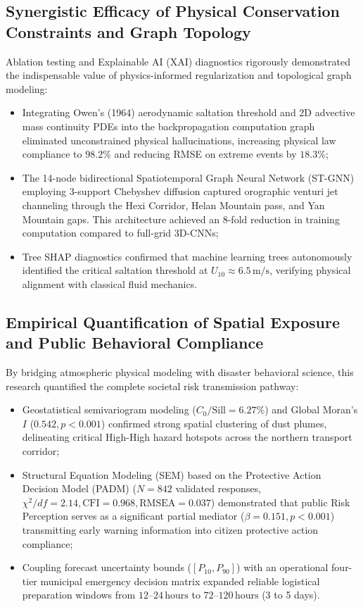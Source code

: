 \subsection{Synergistic Efficacy of Physical Conservation Constraints and Graph Topology}
\label{subsec:concl_pinn_gnn}

Ablation testing and Explainable AI (XAI) diagnostics rigorously demonstrated the indispensable value of physics-informed regularization and topological graph modeling:
\begin{itemize}
    \item Integrating Owen's (1964) aerodynamic saltation threshold and 2D advective mass continuity PDEs into the backpropagation computation graph eliminated unconstrained physical hallucinations, increasing physical law compliance to $98.2\%$ and reducing RMSE on extreme events by $18.3\%$;
    \item The 14-node bidirectional Spatiotemporal Graph Neural Network (ST-GNN) employing 3-support Chebyshev diffusion captured orographic venturi jet channeling through the Hexi Corridor, Helan Mountain pass, and Yan Mountain gaps. This architecture achieved an 8-fold reduction in training computation compared to full-grid 3D-CNNs;
    \item Tree SHAP diagnostics confirmed that machine learning trees autonomously identified the critical saltation threshold at $U_{10} \approx 6.5\,\text{m/s}$, verifying physical alignment with classical fluid mechanics.
\end{itemize}

\subsection{Empirical Quantification of Spatial Exposure and Public Behavioral Compliance}
\label{subsec:concl_spatial_socio}

By bridging atmospheric physical modeling with disaster behavioral science, this research quantified the complete societal risk transmission pathway:
\begin{itemize}
    \item Geostatistical semivariogram modeling ($C_0 / \text{Sill} = 6.27\%$) and Global Moran's $I$ ($0.542, p < 0.001$) confirmed strong spatial clustering of dust plumes, delineating critical High-High hazard hotspots across the northern transport corridor;
    \item Structural Equation Modeling (SEM) based on the Protective Action Decision Model (PADM) ($N=842$ validated responses, $\chi^2/df = 2.14, \text{CFI} = 0.968, \text{RMSEA} = 0.037$) demonstrated that public Risk Perception serves as a significant partial mediator ($\beta = 0.151, p < 0.001$) transmitting early warning information into citizen protective action compliance;
    \item Coupling forecast uncertainty bounds ($[P_{10}, P_{90}]$) with an operational four-tier municipal emergency decision matrix expanded reliable logistical preparation windows from $12\text{--}24\,\text{hours}$ to $72\text{--}120\,\text{hours}$ (3 to 5 days).
\end{itemize}

